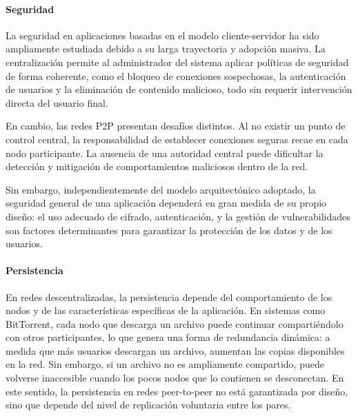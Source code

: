 \paragraph{Seguridad}

La seguridad en aplicaciones basadas en el modelo cliente-servidor ha sido ampliamente estudiada debido a su larga trayectoria y adopción masiva. La centralización permite al administrador del sistema aplicar políticas de seguridad de forma coherente, como el bloqueo de conexiones sospechosas, la autenticación de usuarios y la eliminación de contenido malicioso, todo sin requerir intervención directa del usuario final.

En cambio, las redes P2P presentan desafíos distintos. Al no existir un punto de control central, la responsabilidad de establecer conexiones seguras recae en cada nodo participante. La ausencia de una autoridad central puede dificultar la detección y mitigación de comportamientos maliciosos dentro de la red.

Sin embargo, independientemente del modelo arquitectónico adoptado, la seguridad general de una aplicación dependerá en gran medida de su propio diseño: el uso adecuado de cifrado, autenticación, y la gestión de vulnerabilidades son factores determinantes para garantizar la protección de los datos y de los usuarios.

\paragraph{Persistencia}

En redes descentralizadas, la persistencia depende del comportamiento de los nodos y de las características específicas de la aplicación. En sistemas como BitTorrent, cada nodo que descarga un archivo puede continuar compartiéndolo con otros participantes, lo que genera una forma de redundancia dinámica: a medida que más usuarios descargan un archivo, aumentan las copias disponibles en la red. Sin embargo, si un archivo no es ampliamente compartido, puede volverse inaccesible cuando los pocos nodos que lo contienen se desconectan. En este sentido, la persistencia en redes peer-to-peer no está garantizada por diseño, sino que depende del nivel de replicación voluntaria entre los pares.

